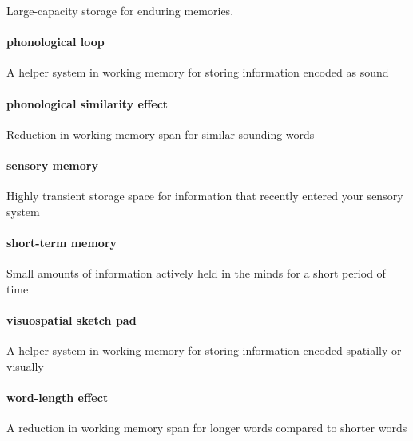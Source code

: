 \documentclass[
]{krantz}
\begin{document}
Large-capacity storage for enduring memories.

\paragraph*{phonological loop}\label{phonological-loop}

A helper system in working memory for storing information encoded as sound

\paragraph*{phonological similarity effect}\label{phonological-similarity-effect}

Reduction in working memory span for similar-sounding words

\paragraph*{sensory memory}\label{sensory-memory}

Highly transient storage space for information that recently entered your sensory system

\paragraph*{short-term memory}\label{short-term-memory-1}

Small amounts of information actively held in the minds for a short period of time

\paragraph*{visuospatial sketch pad}\label{visuospatial-sketch-pad}

A helper system in working memory for storing information encoded spatially or visually

\paragraph*{word-length effect}\label{word-length-effect}

A reduction in working memory span for longer words compared to shorter words
\end{document}
